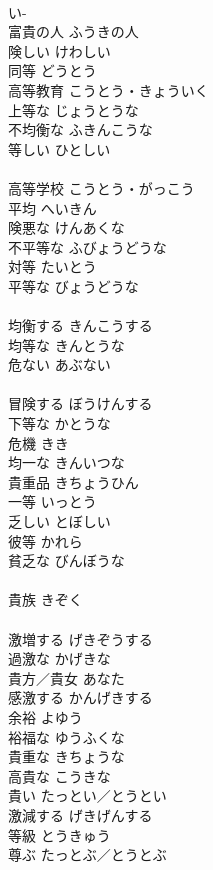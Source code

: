 \documentclass[8pt]{extreport}
\begin{document}
\begin{CJK}{UTF8}{min}
\\	い-
\\	富貴の人	ふうきの人	
\\	険しい	けわしい	
\\	同等	どうとう	
\\	高等教育	こうとう・きょういく	
\\	上等な	じょうとうな	
\\	不均衡な	ふきんこうな	
\\	等しい	ひとしい	
\\	[和語]
\\	高等学校	こうとう・がっこう	
\\	平均	へいきん	
\\	険悪な	けんあくな	
\\	不平等な	ふびょうどうな	
\\	対等	たいとう	
\\	平等な	びょうどうな	
\\	[漢語]
\\	均衡する	きんこうする	
\\	均等な	きんとうな	
\\	危ない	あぶない	
\\	[和語]
\\	冒険する	ぼうけんする	
\\	下等な	かとうな	
\\	危機	きき	
\\	均一な	きんいつな	
\\	貴重品	きちょうひん	
\\	一等	いっとう	
\\	乏しい	とぼしい	
\\	彼等	かれら	
\\	貧乏な	びんぼうな	
\\	[漢語]
\\	貴族	きぞく	
\\	[漢語]
\\	激増する	げきぞうする	
\\	過激な	かげきな	
\\	貴方／貴女	あなた	
\\	感激する	かんげきする	
\\	余裕	よゆう	
\\	裕福な	ゆうふくな	
\\	貴重な	きちょうな	
\\	高貴な	こうきな	
\\	貴い	たっとい／とうとい	
\\	激減する	げきげんする	
\\	等級	とうきゅう	
\\	尊ぶ	たっとぶ／とうとぶ	

\end{CJK}
\end{document}
